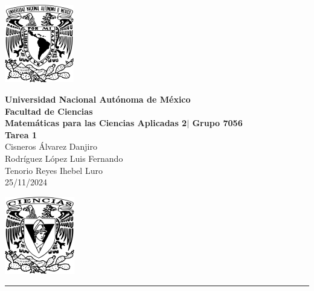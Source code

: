 \documentclass[11pt,letterpaper]{article}
\begin{document}

\begin{center}
    \begin{minipage}{3cm}
    	\begin{center}
    		\includegraphics[height=3.4cm]{./imagenes/logo_unam.png}
    	\end{center}
    \end{minipage}\hfill
    \begin{minipage}{10cm}
    	\begin{center}
    	\textbf{\large Universidad Nacional Autónoma de México}\\[0.1cm]
        \textbf{Facultad de Ciencias}\\[0.1cm]
        \textbf{Matemáticas para las Ciencias Aplicadas 2$|$ Grupo 7056}\\[0.1cm]
        \textbf{Tarea 1 }\\[0.1cm]
        Cisneros Álvarez Danjiro\\[0.1cm]
        Rodríguez López Luis Fernando\\[0.1cm]
        Tenorio Reyes Ihebel Luro\\[0.1cm]
        25/11/2024
    	\end{center}
    \end{minipage}\hfill
    \begin{minipage}{3cm}
    	\begin{center}
    		\includegraphics[height=3.4cm]{./imagenes/Logo_FC.png}
    	\end{center}
    \end{minipage}
\end{center}

\rule{17cm}{0.1mm}

\end{document}
